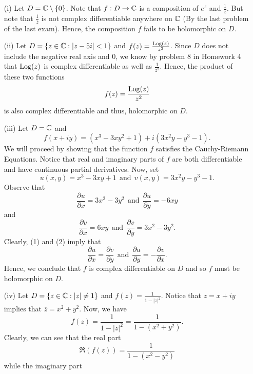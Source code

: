 \documentclass[a4paper]{article}
\begin{document}
\begin{solution}
\begin{enumerate}
    \item[(i)] Let \( D = \mathbb{C} \setminus  \{ 0 \}  \). Note that \( f: D \to \mathbb{C}   \) is a composition of \( e^{z} \) and \( \frac{ 1 }{ \overline{z} }  \). But note that \( \frac{ 1 }{ \overline{z} }  \) is not complex differentiable anywhere on \( \mathbb{C}  \) (By the last problem of the last exam). Hence, the composition \( f  \) fails to be holomorphic on \( D  \).
    \item[(ii)] Let \( D = \{ z \in \mathbb{C} : | z - 5i |  < 1 \}  \) and \( f(z) = \frac{ \operatorname{Log}(z) }{ z^{2} } \). Since \( D  \) does not include the negative real axis and \( 0  \), we know by problem 8 in Homework 4 that \( \operatorname{Log}(z) \) is complex differentiable as well as \( \frac{ 1 }{ z^{2} }  \). Hence, the product of these two functions   
        \[  f(z) = \frac{ \operatorname{Log}(z) }{ z^{2} }  \]
        is also complex differentiable and thus, holomorphic on \( D  \). 
    \item[(iii)] Let \( D = \mathbb{C}  \) and
        \[  f(x+iy) = (x^{3} - 3x y^{2} + 1) + i (3 x^{2} y - y^{3} - 1). \]
        We will proceed by showing that the function \( f  \) satisfies the Cauchy-Riemann Equations. Notice that real and imaginary parts of \( f  \) are both differentiable and have continuous partial derivatives. Now, set 
        \[  u(x,y) = x^{3} - 3xy + 1 \ \ \text{and} \ \ v(x,y) = 3x^{2}y - y^{3} -1. \]
        Observe that 
        \[ \frac{\partial u }{\partial x }  = 3 x^{2} - 3 y^{2} \ \ \text{and} \ \ \frac{\partial u }{\partial y } = - 6xy \tag{1} \] 
       and 
       \[  \frac{\partial v }{\partial x } = 6xy  \ \ \text{and} \ \ \frac{\partial v  }{\partial y }  = 3x^{2} - 3y^{2}. \tag{2} \]
       Clearly, (1) and (2) imply that 
       \[  \frac{\partial u }{\partial x }  = \frac{\partial v }{\partial y } \ \ \text{and} \ \ \frac{\partial u }{\partial y }  = - \frac{\partial v }{\partial x }. \]
       Hence, we conclude that \( f  \) is complex differentiable on \( D  \) and so \( f \) must be holomorphic on \( D  \).
    \item[(iv)] Let \( D = \{ z \in \mathbb{C} : | z  | \neq 1  \}  \) and \( f(z) = \frac{ 1 }{ 1 - | z |^{2} }  \).
        Notice that \( z = x + iy \) implies that \( \overline{z} = x^{2} + y^{2}  \).
        Now, we have 
        \[  f(z) = \frac{ 1 }{ 1 - | z |^{2} }  = \frac{ 1 }{ 1 - (x^{2} + y^{2}) }.  \]
        Clearly, we can see that the real part 
        \[  \Re(f(z)) = \frac{ 1  }{ 1 - (x^{2} - y^{2}) }   \]
        while the imaginary part

\end{enumerate}
\end{solution}
\end{document}
